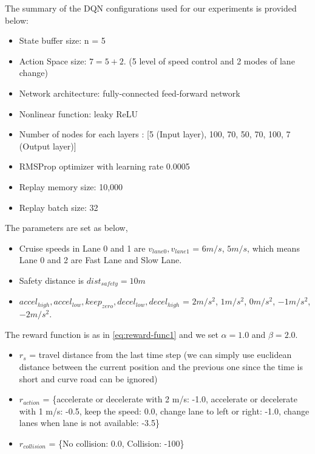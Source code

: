 The summary of the DQN configurations used for our experiments is provided below:

\begin{itemize}
\item State buffer size: n = 5
\item Action Space size: $7 = 5 + 2$. (5 level of speed control and 2 modes of lane change)
\item Network architecture: fully-connected feed-forward network
\item Nonlinear function: leaky ReLU
\item Number of nodes for each layers : [5 (Input layer), 100, 70, 50, 70, 100, 7 (Output layer)]
\item RMSProp optimizer with learning rate 0.0005
\item Replay memory size: 10,000
\item Replay batch size: 32
\end{itemize}

The parameters are set as below,

\begin{itemize}
\item Cruise speeds in Lane 0 and 1 are $v_{lane0}, v_{lane1}$ = $6 m/s$, $5 m/s$, which means Lane 0 and 2 are Fast Lane and Slow Lane.
\item Safety distance is $dist_{safety} = 10 m$
\item $accel_{high}, accel_{low}, keep_{zero}, decel_{low}, decel_{high}$ = $2 m/s^2$, $1 m/s^2$, $0 m/s^2$, $-1 m/s^2$, $-2 m/s^2$.
\end{itemize}

The reward function is as in \ref{eq:reward-func1} and we set $\alpha = 1.0$ and $\beta = 2.0$. 

\begin{itemize}
 \item $r_s$ = travel distance from the last time step (we can simply use euclidean distance between the current position and the previous one since the time is short and curve road can be ignored)
 \item $r_{action}$ = \{accelerate or decelerate with 2 m/s: -1.0, accelerate or decelerate with 1 m/s: -0.5, keep the speed: 0.0, change lane to left or right: -1.0, change lanes when lane is not available: -3.5\}
 \item $r_{collision}$ = \{No collision: 0.0, Collision: -100\}
\end{itemize}

